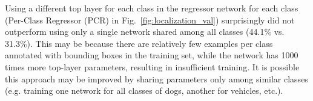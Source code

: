 \documentclass{article} %
\newcommand{\fig}[1]{Fig.~\ref{fig:#1}}
\begin{document}
Using a different top layer for each class in the regressor network for each
class (Per-Class Regressor (PCR) in \fig{localization_val}) surprisingly did not
outperform using only a single network shared among all classes (44.1\% vs.
31.3\%).  This may be because there are relatively few examples per class
annotated with bounding boxes in the training set, while the network has 1000
times more top-layer parameters, resulting in insufficient training.  It is
possible this approach may be improved by sharing parameters only among similar
classes (e.g. training one network for all classes of dogs, another for
vehicles, etc.).

\end{document}
